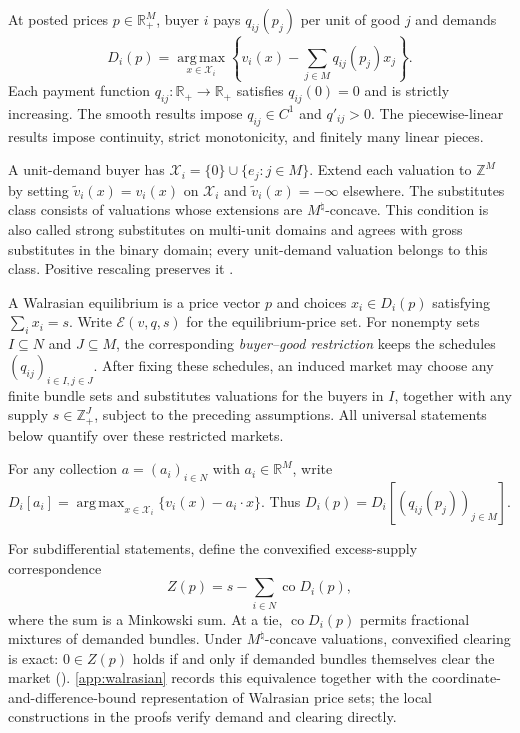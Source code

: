 \documentclass[11pt,a4paper,fleqn]{article}
\theoremstyle{plain}
\theoremstyle{definition}
\newcommand{\R}{\mathbb{R}}
\newcommand{\Z}{\mathbb{Z}}
\newcommand{\co}{\operatorname{co}}
\newcommand{\argmax}{\operatorname*{arg\,max}}
\newcommand{\Ecal}{\mathcal{E}}
\newcommand{\Xcal}{\mathcal{X}}
\begin{document}
At posted prices $p\in\R_+^M$, buyer $i$ pays $q_{ij}(p_j)$ per unit of good $j$ and demands
\begin{equation}\label{eq:demand}
D_i(p)=\argmax_{x\in\Xcal_i}
\left\{v_i(x)-\sum_{j\in M}q_{ij}(p_j)x_j\right\}.
\end{equation}
Each payment function $q_{ij}:\R_+\to\R_+$ satisfies $q_{ij}(0)=0$ and is strictly increasing. The smooth results impose $q_{ij}\in C^1$ and $q'_{ij}>0$. The piecewise-linear results impose continuity, strict monotonicity, and finitely many linear pieces.

A unit-demand buyer has $\Xcal_i=\{0\}\cup\{e_j:j\in M\}$. Extend each valuation to $\Z^M$ by setting $\widetilde v_i(x)=v_i(x)$ on $\Xcal_i$ and $\widetilde v_i(x)=-\infty$ elsewhere. The substitutes class consists of valuations whose extensions are $M^\natural$-concave. This condition is also called strong substitutes on multi-unit domains and agrees with gross substitutes in the binary domain; every unit-demand valuation belongs to this class. Positive rescaling preserves it \citep{murota2003,murota2016,paesleme2017}.

A Walrasian equilibrium is a price vector $p$ and choices $x_i\in D_i(p)$ satisfying $\sum_i x_i=s$. Write $\Ecal(v,q,s)$ for the equilibrium-price set. For nonempty sets $I\subseteq N$ and $J\subseteq M$, the corresponding \emph{buyer--good restriction} keeps the schedules $(q_{ij})_{i\in I,j\in J}$. After fixing these schedules, an induced market may choose any finite bundle sets and substitutes valuations for the buyers in $I$, together with any supply $s\in\Z_+^J$, subject to the preceding assumptions. All universal statements below quantify over these restricted markets.

For any collection $a=(a_i)_{i\in N}$ with $a_i\in\R^M$, write $D_i[a_i]=\argmax_{x\in\Xcal_i}\{v_i(x)-a_i\cdot x\}$. Thus $D_i(p)=D_i[(q_{ij}(p_j))_{j\in M}]$.

For subdifferential statements, define the convexified excess-supply correspondence
\begin{equation}\label{eq:Z}
Z(p)=s-\sum_{i\in N}\co D_i(p),
\end{equation}
where the sum is a Minkowski sum. At a tie, $\co D_i(p)$ permits fractional mixtures of demanded bundles. Under $M^\natural$-concave valuations, convexified clearing is exact: $0\in Z(p)$ holds if and only if demanded bundles themselves clear the market (). \ref{app:walrasian} records this equivalence together with the coordinate-and-difference-bound representation of Walrasian price sets; the local constructions in the proofs verify demand and clearing directly.
\end{document}
